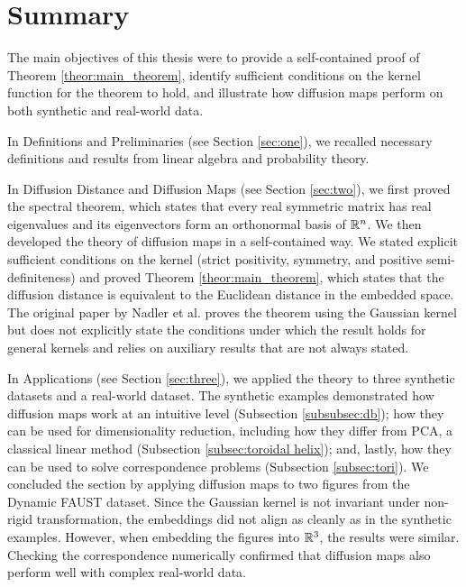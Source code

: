 \section*{Summary}

The main objectives of this thesis were to provide a self-contained proof of Theorem \ref{theor:main_theorem}, identify sufficient conditions on the kernel function for the theorem to hold, and illustrate how diffusion maps perform on both synthetic and real-world data. 

In Definitions and Preliminaries (see Section \ref{sec:one}), we recalled necessary definitions and results from linear algebra and probability theory. 

In Diffusion Distance and Diffusion Maps (see Section \ref{sec:two}), we first proved the spectral theorem, which states that every real symmetric matrix has real eigenvalues and its eigenvectors form an orthonormal basis of $\mathbb{R}^n$. We then developed the theory of diffusion maps in a self-contained way. We stated explicit sufficient conditions on the kernel (strict positivity, symmetry, and positive semi-definiteness) and proved Theorem \ref{theor:main_theorem}, which states that the diffusion distance is equivalent to the Euclidean distance in the embedded space. The original paper by Nadler et al. \cite{nips:dif_maps} proves the theorem using the Gaussian kernel but does not explicitly state the conditions under which the result holds for general kernels and relies on auxiliary results that are not always stated.

In Applications (see Section \ref{sec:three}), we applied the theory to three synthetic datasets and a real-world dataset. The synthetic examples demonstrated how diffusion maps work at an intuitive level (Subsection \ref{subsubsec:db}); how they can be used for dimensionality reduction, including how they differ from PCA, a classical linear method (Subsection \ref{subsec:toroidal helix}); and, lastly, how they can be used to solve correspondence problems (Subsection \ref{subsec:tori}). We concluded the section by applying diffusion maps to two figures from the Dynamic FAUST dataset. Since the Gaussian kernel is not invariant under non-rigid transformation, the embeddings did not align as cleanly as in the synthetic examples. However, when embedding the figures into $\mathbb{R}^3$, the results were similar. Checking the correspondence numerically confirmed that diffusion maps also perform well with complex real-world data.

